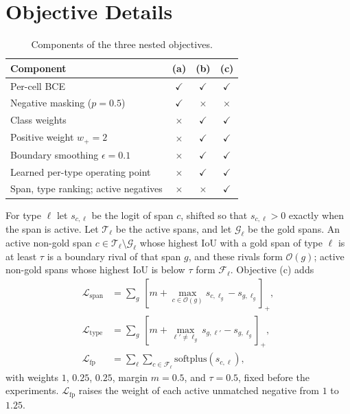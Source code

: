 \documentclass[11pt]{article}
\newcommand{\yes}{$\checkmark$}
\newcommand{\no}{$\times$}
\begin{document}
\FloatBarrier
\section{Objective Details}
\label{app:objectives}

\begin{table}[h]
\centering
\small
\setlength{\tabcolsep}{5pt}
\begin{tabular}{@{}lccc@{}}
\toprule
Component & (a) & (b) & (c) \\
\midrule
Per-cell BCE & \yes & \yes & \yes \\
Negative masking ($p=0.5$) & \yes & \no & \no \\
Class weights & \no & \yes & \yes \\
Positive weight $w_{+}=2$ & \no & \yes & \yes \\
Boundary smoothing $\epsilon=0.1$ & \no & \yes & \yes \\
Learned per-type operating point & \no & \yes & \yes \\
Span, type ranking; active negatives & \no & \no & \yes \\
\bottomrule
\end{tabular}
\caption{Components of the three nested objectives.}
\label{tab:objectives}
\end{table}


For type $\ell$ let $s_{c,\ell}$ be the logit of span $c$, shifted so
that $s_{c,\ell}>0$ exactly when the span is active. Let
$\mathcal{T}_\ell$ be the active spans, and let $\mathcal{G}_\ell$ be
the gold spans. An active non-gold span $c\in\mathcal{T}_\ell\setminus\mathcal{G}_\ell$
whose highest IoU with a gold span of type $\ell$ is at least $\tau$ is a
boundary rival of that span $g$, and these rivals form $\mathcal{O}(g)$;
active non-gold spans whose highest IoU is below $\tau$ form $\mathcal{F}_\ell$. Objective (c)
adds
\begin{align*}
\mathcal{L}_{\mathrm{span}}&=\textstyle\sum_{g}\,[m+\max_{c\in\mathcal{O}(g)}s_{c,\ell_g}-s_{g,\ell_g}]_+,\\
\mathcal{L}_{\mathrm{type}}&=\textstyle\sum_{g}\,[m+\max_{\ell'\neq\ell_g}s_{g,\ell'}-s_{g,\ell_g}]_+,\\
\mathcal{L}_{\mathrm{fp}}&=\textstyle\sum_{\ell}\sum_{c\in\mathcal{F}_\ell}\mathrm{softplus}(s_{c,\ell}),
\end{align*}
with weights $1$, $0.25$, $0.25$, margin $m=0.5$, and $\tau=0.5$, fixed
before the experiments. $\mathcal{L}_{\mathrm{fp}}$ raises the weight of
each active unmatched negative from $1$ to $1.25$.
\end{document}
